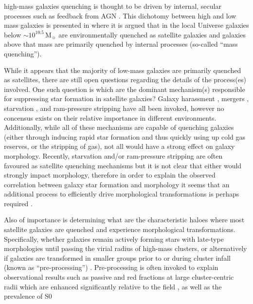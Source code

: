 \documentclass[a4paper,fleqn,usenatbib]{mnras}
\newcommand{\Msun}{\,\mathrm{M_{\sun}}}
\begin{document}
high-mass galaxies quenching is thought to be driven by internal, secular
processes such as feedback from AGN \citep[e.g.][]{schawinski2009}.  This
dichotomy between high and low mass galaxies is 
presented in \citet{peng2010} where it is argued that in
the local Universe galaxies below $\sim 10^{10.5}\Msun$ are
environmentally quenched as satellite galaxies and galaxies above that
mass are primarily quenched by internal processes (so-called ``mass
quenching'').
\par
While it appears that the majority of low-mass galaxies are primarily quenched
as satellites, there are still open questions regarding the details of
the process(es) involved.  One such question is which are the dominant
mechanism(s)
responsible for suppressing star formation in satellite galaxies?
Galaxy harassment \citep[e.g.][]{moore1996}, mergers \citep[e.g.][]{mihos1994},
starvation \citep[e.g.][]{kawata2008}, and ram-pressure stripping
\citep[e.g.][]{gunn1972} have all been invoked, however no concensus
exists on their relative importance in different environments.
Additionally, while all of these mechanisms are capable of
quenching galaxies (either through inducing rapid star formation and
thus quickly using up cold gas reserves, or
the stripping of gas), not all would have a strong effect on galaxy
morphology.  Recently, starvation and/or ram-pressure stripping are
often favoured
as satellite quenching mechanisms \citep{muzzin2014, peng2015, fillingham2015,
  weisz2015, wetzel2015} but it is not clear that either
would strongly impact morphology, therefore in order to explain the
observed correlation between galaxy star formation and morphology it
seems that an additional process to efficiently drive morphological
transformations is perhaps required \citep[e.g.][]{christlein2004}.
\par
Also of importance is determining what are
the characteristic haloes where most satellite galaxies are
quenched and experience morphological transformations.  Specifically, whether galaxies remain actively forming
stars with late-type morphologies until passing the virial radius of high-mass clusters, or
alternatively if galaxies are transformed in smaller groups prior
to or during cluster infall (known as ``pre-processing'')
\citep[e.g.][]{fujita2004}.  Pre-processing is
often invoked to explain observational results such as passive and
red fractions at large cluster-centric radii which are enhanced
significantly relative to the field \citep{lu2012, wetzel2012,
  bahe2013, haines2015, just2015}, as well as the prevalence of S0
\end{document}

